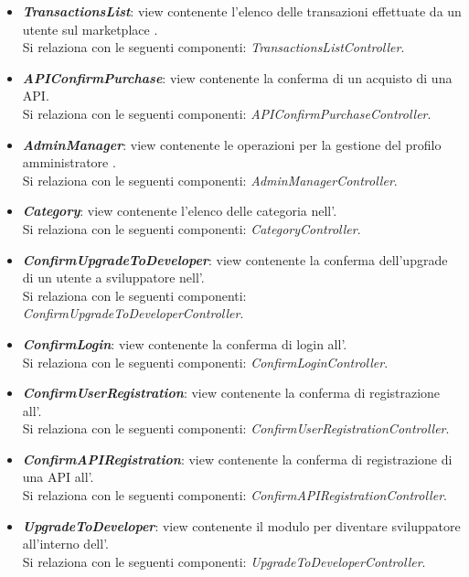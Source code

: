 \begin{itemize}
\begin{itemize}
		\item \textbf{\textit{TransactionsList}}: view contenente l'elenco delle transazioni effettuate da un utente sul marketplace \progetto.\\
		Si relaziona con le seguenti componenti: \textit{TransactionsListController}.
		
		\item \textbf{\textit{APIConfirmPurchase}}: view contenente la conferma di un acquisto di una API.\\
		Si relaziona con le seguenti componenti: \textit{APIConfirmPurchaseController}.
		
		\item \textbf{\textit{AdminManager}}: view contenente le operazioni per la gestione del profilo amministratore \progetto.\\
		Si relaziona con le seguenti componenti: \textit{AdminManagerController}.
		
		\item \textbf{\textit{Category}}: view contenente l'elenco delle categoria nell'\progetto.\\
		Si relaziona con le seguenti componenti: \textit{CategoryController}.
		
		\item \textbf{\textit{ConfirmUpgradeToDeveloper}}: view contenente la conferma dell'upgrade di un utente a sviluppatore nell'\progetto.\\
		Si relaziona con le seguenti componenti: \textit{ConfirmUpgradeToDeveloperController}.
		
		\item \textbf{\textit{ConfirmLogin}}: view contenente la conferma di login all'\progetto.\\
		Si relaziona con le seguenti componenti: \textit{ConfirmLoginController}.
		
		\item \textbf{\textit{ConfirmUserRegistration}}: view contenente la conferma di registrazione all'\progetto.\\
		Si relaziona con le seguenti componenti: \textit{ConfirmUserRegistrationController}.
		
		\item \textbf{\textit{ConfirmAPIRegistration}}: view contenente la conferma di registrazione di una API all'\progetto.\\
		Si relaziona con le seguenti componenti: \textit{ConfirmAPIRegistrationController}.
		
		\item \textbf{\textit{UpgradeToDeveloper}}: view contenente il modulo per diventare sviluppatore all'interno dell'\progetto.\\
		Si relaziona con le seguenti componenti: \textit{UpgradeToDeveloperController}.
		

\end{itemize}
\end{itemize}
